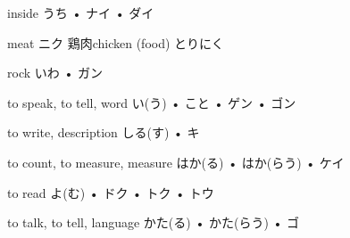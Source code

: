 



\setcounter{cardnum}{57}

		{inside}
		{うち • ナイ • ダイ}
		{}{}
		{}{}
		{}{}
		{}{}
		{}{}

		{meat}
		{ニク}
		{鶏肉}{chicken (food) とりにく}
		{}{}
		{}{}
		{}{}
		{}{}

		{rock}
		{いわ • ガン}
		{}{}
		{}{}
		{}{}
		{}{}
		{}{}

		{to speak, to tell, word}
		{い(う) • こと • ゲン • ゴン}
		{}{}
		{}{}
		{}{}
		{}{}
		{}{}

		{to write, description}
		{しる(す) • キ}
		{}{}
		{}{}
		{}{}
		{}{}
		{}{}

		{to count, to measure, measure}
		{はか(る) • はか(らう) • ケイ}
		{}{}
		{}{}
		{}{}
		{}{}
		{}{}

		{to read}
		{よ(む) • ドク • トク • トウ}
		{}{}
		{}{}
		{}{}
		{}{}
		{}{}

		{to talk, to tell, language}
		{かた(る) • かた(らう) • ゴ}
		{}{}
		{}{}
		{}{}
		{}{}
		{}{}

